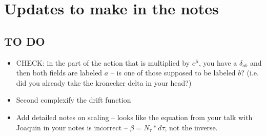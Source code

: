\documentclass[../RotatingBosons.tex]{subfiles}
\begin{document}
\section{Updates to make in the notes}
\subsection{TO DO}
\begin{itemize}
	\item CHECK: in the part of the action that is multiplied by $e^{\bar{\mu}}$, you have a $\delta_{ab}$ and then both fields are labeled $a$ -- is one of those supposed to be labeled $b$? (i.e. did you already take the kronecker delta in your head?) 
	\item Second complexify the drift function		
	\item Add detailed notes on scaling -- looks like the equation from your talk with Joaquin in your notes is incorrect -- $\beta = N_{\tau}*d\tau$, not the inverse.
\end{itemize}
\end{document}
